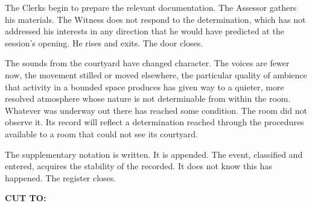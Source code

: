 \documentclass[12pt, oneside]{article}
\newcommand{\sceneheading}[1]{%
  \vspace{1.8em}%
  \noindent{\bfseries\large\MakeUppercase{#1}}%
  \vspace{0.6em}%
  \par\noindent{\color{rulecolor}\rule{\linewidth}{0.3pt}}%
  \vspace{0.5em}\par%
}
\newenvironment{action}{%
  \vspace{0.6em}%
  \noindent\ignorespaces%
}{%
  \par\vspace{0.6em}%
}
\newcommand{\transition}[1]{%
  \vspace{0.8em}%
  \begin{flushright}%
    \bfseries #1%
  \end{flushright}%
  \vspace{0.5em}%
}
\begin{document}
\begin{action}
The Clerks begin to prepare the relevant documentation. The Assessor gathers his materials. The Witness does not respond to the determination, which has not addressed his interests in any direction that he would have predicted at the session's opening. He rises and exits. The door closes.

The sounds from the courtyard have changed character. The voices are fewer now, the movement stilled or moved elsewhere, the particular quality of ambience that activity in a bounded space produces has given way to a quieter, more resolved atmosphere whose nature is not determinable from within the room. Whatever was underway out there has reached some condition. The room did not observe it. Its record will reflect a determination reached through the procedures available to a room that could not see its courtyard.

The supplementary notation is written. It is appended. The event, classified and entered, acquires the stability of the recorded. It does not know this has happened. The register closes.
\end{action}

\transition{CUT TO:}

\sceneheading{INT. Writing Room --- Night}
\end{document}
